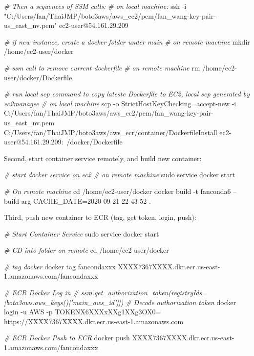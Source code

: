 \documentclass[
]{book}
\newenvironment{Shaded}{\begin{snugshade}}{\end{snugshade}}
\newcommand{\BuiltInTok}[1]{#1}
\newcommand{\CommentTok}[1]{\textcolor[rgb]{0.56,0.35,0.01}{\textit{#1}}}
\newcommand{\ExtensionTok}[1]{#1}
\newcommand{\FunctionTok}[1]{\textcolor[rgb]{0.00,0.00,0.00}{#1}}
\newcommand{\NormalTok}[1]{#1}
\newcommand{\StringTok}[1]{\textcolor[rgb]{0.31,0.60,0.02}{#1}}
\begin{document}
\begin{Shaded}
\begin{Highlighting}[]
\CommentTok{# Then a sequences of SSM calls:}
\CommentTok{# on local machine:}
\FunctionTok{ssh}\NormalTok{ -i }\StringTok{"C:/Users/fan/ThaiJMP/boto3aws/aws_ec2/pem/fan_wang-key-pair-us_east_nv.pem"}\NormalTok{ ec2-user@54.161.29.209}

\CommentTok{# if new instance, create a docker folder under main}
\CommentTok{# on remote machine}
\FunctionTok{mkdir}\NormalTok{ /home/ec2-user/docker}

\CommentTok{# ssm call to remove current dockerfile}
\CommentTok{# on remote machine}
\FunctionTok{rm}\NormalTok{ /home/ec2-user/docker/Dockerfile}

\CommentTok{# run local scp command to copy lateste Dockerfile to EC2, local scp generated by ec2managee}
\CommentTok{# on local machine}
\FunctionTok{scp}\NormalTok{ -o StrictHostKeyChecking=accept-new -i C:/Users/fan/ThaiJMP/boto3aws/aws_ec2/pem/fan_wang-key-pair-us_east_nv.pem C:/Users/fan/ThaiJMP/boto3aws/aws_ecr/container/DockerfileInstall ec2-user@54.161.29.209:~/docker/Dockerfile}
\end{Highlighting}
\end{Shaded}

Second, start container service remotely, and build new container:

\begin{Shaded}
\begin{Highlighting}[]
\CommentTok{# start docker service on ec2}
\CommentTok{# on remote machine}
\FunctionTok{sudo}\NormalTok{ service docker start}

\CommentTok{# On remote machine}
\BuiltInTok{cd}\NormalTok{ /home/ec2-user/docker}
\ExtensionTok{docker}\NormalTok{ build -t fanconda6 --build-arg CACHE_DATE=2020-09-21-22-43-52 .}
\end{Highlighting}
\end{Shaded}

Third, push new container to ECR (tag, get token, login, push):

\begin{Shaded}
\begin{Highlighting}[]
\CommentTok{# Start Container Service}
\FunctionTok{sudo}\NormalTok{ service docker start}

\CommentTok{# CD into folder on remote}
\BuiltInTok{cd}\NormalTok{ /home/ec2-user/docker}

\CommentTok{# tag docker}
\ExtensionTok{docker}\NormalTok{ tag fancondaxxx XXXX7367XXXX.dkr.ecr.us-east-1.amazonaws.com/fancondaxxx}

\CommentTok{# ECR Docker Log in}
\CommentTok{# ssm.get_authorization_token(registryIds=[boto3aws.aws_keys()['main_aws_id']])}
\CommentTok{# Decode authorization token}
\ExtensionTok{docker}\NormalTok{ login -u AWS -p TOKENX6XXXxXXg1XXg3OX0= https://XXXX7367XXXX.dkr.ecr.us-east-1.amazonaws.com}

\CommentTok{# ECR Docker Push to ECR}
\ExtensionTok{docker}\NormalTok{ push XXXX7367XXXX.dkr.ecr.us-east-1.amazonaws.com/fancondaxxx}
\end{Highlighting}
\end{Shaded}
\end{document}
